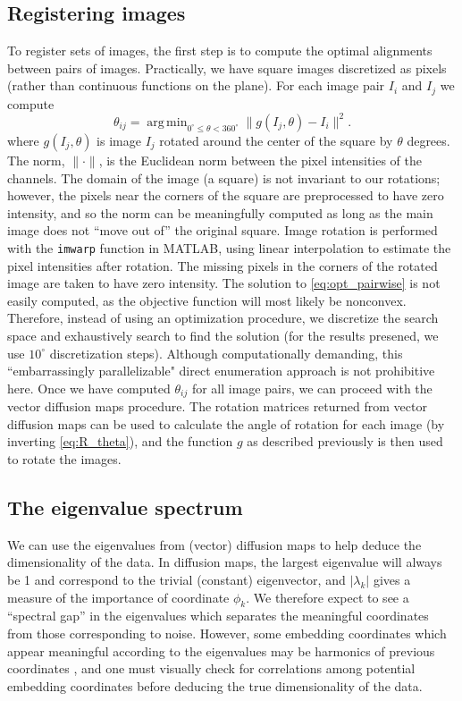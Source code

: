 \documentclass[10pt,twocolumn]{article}
\DeclareMathOperator*{\argmin}{arg\,min}
\begin{document}
\subsection*{Registering images} \label{subsec:trans_rot_register}

To register sets of images, 
the first step is to compute the optimal alignments between pairs of images.
%
Practically, we have square images discretized as pixels (rather than continuous functions on the plane).
%
For each image pair $I_i$ and $I_j$ we compute
\begin{equation}\label{eq:opt_pairwise}
\theta_{ij} = \argmin_{
0^\circ \le \theta < 360^\circ }
 \|g(I_j, \theta) - I_i \|^2.
\end{equation}
where $g(I_j, \theta)$ is image $I_j$ rotated around the center of the square by $\theta$ degrees.
%
The norm, $\| \cdot \|$, is the Euclidean norm between the pixel intensities of the channels.
%
The domain of the image (a square) is not invariant to our rotations; however, the pixels near the corners of the square are preprocessed to have zero intensity, and so the norm can be meaningfully computed as long as the main image does not ``move out of'' the original square.
%
Image rotation is performed with the \texttt{imwarp} function in MATLAB, using linear interpolation to estimate the pixel intensities after rotation.
%
The missing pixels in the corners of the rotated image are taken to have zero intensity.
%
The solution to \eqref{eq:opt_pairwise} is not easily computed, as the objective function will most likely be nonconvex.
%
Therefore, instead of using an optimization procedure, we discretize the search space and exhaustively search to find the solution (for the results presened, we use $10^\circ$ discretization steps).
%
Although computationally demanding, this ``embarrassingly parallelizable" direct enumeration approach is not prohibitive here.
%
Once we have computed $\theta_{ij}$ for all image pairs, we can proceed with the vector diffusion maps procedure.
%
The rotation matrices returned from vector diffusion maps can be used to calculate the angle of rotation for each image (by inverting \eqref{eq:R_theta}), and the function $g$ as described previously is then used to rotate the images.

\subsection*{The eigenvalue spectrum}

We can use the eigenvalues from (vector) diffusion maps to help deduce the dimensionality of the data.
%
In diffusion maps, the largest eigenvalue will always be 1 and correspond to the trivial (constant) eigenvector, and $|\lambda_k|$ gives a measure of the importance of coordinate $\phi_k$. 
%
We therefore expect to see a ``spectral gap'' in the eigenvalues which separates the meaningful coordinates from those corresponding to noise.
%
However, some embedding coordinates which appear meaningful according to the eigenvalues may be harmonics of previous coordinates \citep{ferguson2010systematic}, 
and one must visually check for correlations among potential embedding coordinates before deducing the true dimensionality of the data. 
\end{document}
